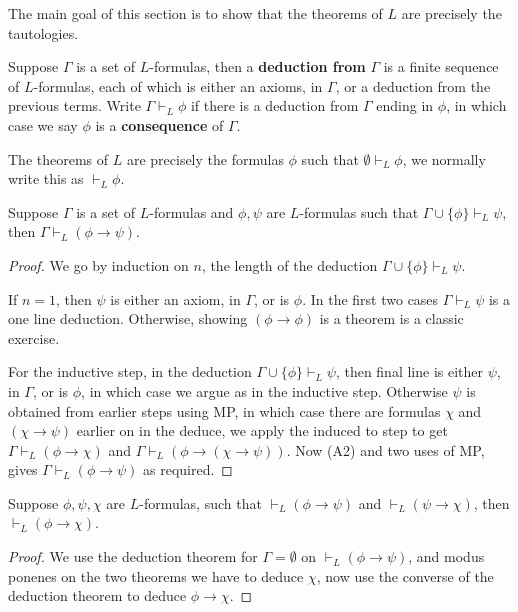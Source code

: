 \documentclass{article}
\begin{document}
The main goal of this section is to show that the theorems of $L$ are precisely the tautologies.

\begin{definition}
    Suppose $\Gamma$ is a set of $L$-formulas, then a \textbf{deduction from} $\Gamma$ is a finite sequence of $L$-formulas, each of which is either an axioms, in $\Gamma$, or a deduction from the previous terms. Write $\Gamma\vdash_L\phi$ if there is a deduction from $\Gamma$ ending in $\phi$, in which case we say $\phi$ is a \textbf{consequence} of $\Gamma$.
\end{definition}

The theorems of $L$ are precisely the formulas $\phi$ such that $\emptyset\vdash_L\phi$, we normally write this as $\vdash_L\phi$.

\begin{proposition}
    Suppose $\Gamma$ is a set of $L$-formulas and $\phi,\psi$ are $L$-formulas such that $\Gamma\cup\{\phi\}\vdash_L\psi$, then $\Gamma\vdash_L(\phi\rightarrow\psi)$.
    \begin{proof}
        We go by induction on $n$, the length of the deduction $\Gamma\cup\{\phi\}\vdash_L\psi$.

        If $n=1$, then $\psi$ is either an axiom, in $\Gamma$, or is $\phi$. In the first two cases $\Gamma\vdash_L\psi$ is a one line deduction. Otherwise, showing $(\phi\rightarrow\phi)$ is a theorem is a classic exercise.

        For the inductive step, in the deduction $\Gamma\cup\{\phi\}\vdash_L\psi$, then final line is either $\psi$, in $\Gamma$, or is $\phi$, in which case we argue as in the inductive step. Otherwise $\psi$ is obtained from earlier steps using MP, in which case there are formulas $\chi$ and $(\chi\rightarrow\psi)$ earlier on in the deduce, we apply the induced to step to get $\Gamma\vdash_L(\phi\rightarrow\chi)$ and $\Gamma\vdash_L(\phi\rightarrow(\chi\rightarrow\psi))$. Now (A2) and two uses of MP, gives $\Gamma\vdash_L(\phi\rightarrow\psi)$ as required.
    \end{proof}
\end{proposition}

\begin{corollary}
    Suppose $\phi,\psi,\chi$ are $L$-formulas, such that $\vdash_L(\phi\rightarrow\psi)$ and $\vdash_L(\psi\rightarrow\chi)$, then $\vdash_L(\phi\rightarrow\chi)$.
    \begin{proof}
        We use the deduction theorem for $\Gamma=\emptyset$ on $\vdash_L(\phi\rightarrow\psi)$, and modus ponenes on the two theorems we have to deduce $\chi$, now use the converse of the deduction theorem to deduce $\phi\rightarrow\chi$.
    \end{proof}
\end{corollary}
\end{document}
